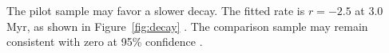 The pilot sample may favor a slower decay. The fitted rate is $r=-2.5$ at 3.0 Myr, as shown in Figure~\ref{fig:decay} \citep{DemoA}. The comparison sample may remain consistent with zero at 95\% confidence \citep{DemoB}.
